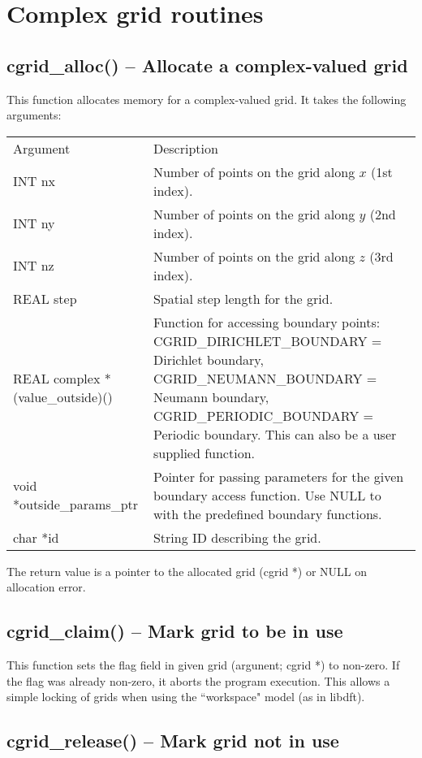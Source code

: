 \documentclass[12pt,letterpaper]{report}
\begin{document}
\section{Complex grid routines}

\subsection{cgrid\_alloc() -- Allocate a complex-valued grid}

This function allocates memory for a complex-valued grid. It takes the following arguments:
\begin{longtable}{p{} p{}}
Argument & Description\\
\cline{1-2}
INT nx & Number of points on the grid along $x$ (1st index).\\
INT ny & Number of points on the grid along $y$ (2nd index).\\
INT nz & Number of points on the grid along $z$ (3rd index).\\
REAL step & Spatial step length for the grid.\\
REAL complex *(value\_outside)() & Function for accessing boundary points: CGRID\_DIRICHLET\_BOUNDARY = Dirichlet boundary, CGRID\_NEUMANN\_BOUNDARY = Neumann boundary, CGRID\_PERIODIC\_BOUNDARY  = Periodic boundary. This can also be a user supplied function.\\
void *outside\_params\_ptr & Pointer for passing parameters for the given boundary access function. Use NULL to with the predefined boundary functions.\\
char *id & String ID describing the grid.
\end{longtable}
\noindent
The return value is a pointer to the allocated grid (cgrid *) or NULL on allocation error.

\subsection{cgrid\_claim() -- Mark grid to be in use}

This function sets the flag field in given grid (argunent; cgrid *) to non-zero. If the flag was already non-zero, it aborts the program execution. This allows a simple locking of grids when using the ``workspace" model (as in libdft).

\subsection{cgrid\_release() -- Mark grid not in use}
\end{document}
